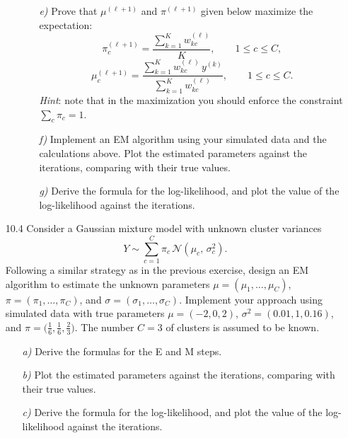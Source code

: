 \begin{enumerate}
\begin{enumerate}
\begin{enumerate}
    \item[\textit{e)}] Prove that $\mu^{(\ell+1)}$ and $\pi^{(\ell+1)}$ given below maximize the
    expectation:
    \[
      \pi_c^{(\ell+1)} = \frac{\sum_{k=1}^{K} w_{kc}^{(\ell)}}{K}, \qquad 1 \leq c \leq C,
    \]
    \[
      \mu_c^{(\ell+1)} = \frac{\sum_{k=1}^{K} w_{kc}^{(\ell)}\, y^{(k)}}{\sum_{k=1}^{K} w_{kc}^{(\ell)}},
      \qquad 1 \leq c \leq C.
    \]
    \textit{Hint}: note that in the maximization you should enforce the constraint
    $\sum_c \pi_c = 1$.

    \item[\textit{f)}] Implement an EM algorithm using your simulated data and the calculations
    above. Plot the estimated parameters against the iterations, comparing with their true values.

    \item[\textit{g)}] Derive the formula for the log-likelihood, and plot the value of the
    log-likelihood against the iterations.
  \end{enumerate}
\end{enumerate}

\item[10.4] Consider a Gaussian mixture model with unknown cluster variances
\[
  Y \sim \sum_{c=1}^{C} \pi_c\, \mathcal{N}(\mu_c,\, \sigma_c^2).
\]
Following a similar strategy as in the previous exercise, design an EM algorithm to estimate the
unknown parameters $\mu = (\mu_1, \ldots, \mu_C)$, $\pi = (\pi_1, \ldots, \pi_C)$, and
$\sigma = (\sigma_1, \ldots, \sigma_C)$. Implement your approach using simulated data with true
parameters $\mu = (-2, 0, 2)$, $\sigma^2 = (0.01, 1, 0.16)$, and
$\pi = \bigl(\tfrac{1}{6}, \tfrac{1}{6}, \tfrac{2}{3}\bigr)$. The number $C = 3$ of clusters is
assumed to be known.

\begin{enumerate}
  \item[\textit{a)}] Derive the formulas for the E and M steps.
  \item[\textit{b)}] Plot the estimated parameters against the iterations, comparing with their
  true values.
  \item[\textit{c)}] Derive the formula for the log-likelihood, and plot the value of the
  log-likelihood against the iterations.
\end{enumerate}

\end{enumerate}

